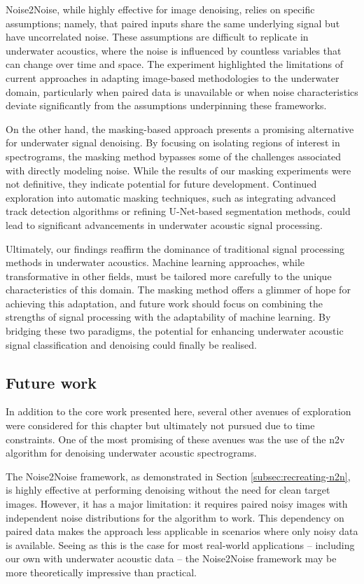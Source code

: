 Noise2Noise, while highly effective for image denoising, relies on specific assumptions; namely, that paired inputs share the same underlying signal but have uncorrelated noise. These assumptions are difficult to replicate in underwater acoustics, where the noise is influenced by countless variables that can change over time and space. The experiment highlighted the limitations of current approaches in adapting image-based methodologies to the underwater domain, particularly when paired data is unavailable or when noise characteristics deviate significantly from the assumptions underpinning these frameworks.

On the other hand, the masking-based approach presents a promising alternative for underwater signal denoising. By focusing on isolating regions of interest in spectrograms, the masking method bypasses some of the challenges associated with directly modeling noise. While the results of our masking experiments were not definitive, they indicate potential for future development. Continued exploration into automatic masking techniques, such as integrating advanced track detection algorithms or refining U-Net-based segmentation methods, could lead to significant advancements in underwater acoustic signal processing.

Ultimately, our findings reaffirm the dominance of traditional signal processing methods in underwater acoustics. Machine learning approaches, while transformative in other fields, must be tailored more carefully to the unique characteristics of this domain. The masking method offers a glimmer of hope for achieving this adaptation, and future work should focus on combining the strengths of signal processing with the adaptability of machine learning. By bridging these two paradigms, the potential for enhancing underwater acoustic signal classification and denoising could finally be realised.

\subsection{Future work}

In addition to the core work presented here, several other avenues of exploration were considered for this chapter but ultimately not pursued due to time constraints. One of the most promising of these avenues was the use of the \acrfull{n2v} algorithm for denoising underwater acoustic spectrograms.

The Noise2Noise framework, as demonstrated in Section \ref{subsec:recreating-n2n}, is highly effective at performing denoising without the need for clean target images. However, it has a major limitation: it requires paired noisy images with independent noise distributions for the algorithm to work. This dependency on paired data makes the approach less applicable in scenarios where only noisy data is available. Seeing as this is the case for most real-world applications -- including our own with underwater acoustic data -- the Noise2Noise framework may be more theoretically impressive than practical.

